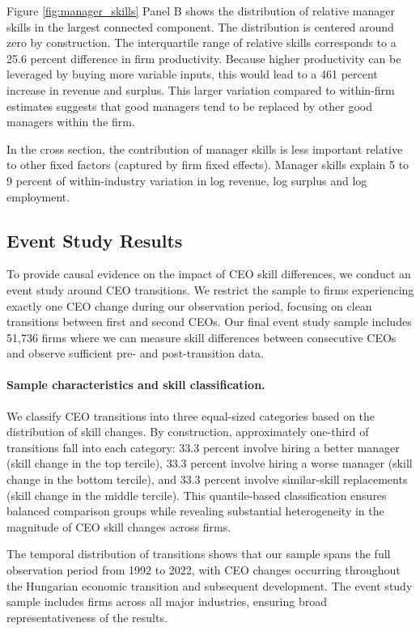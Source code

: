 \documentclass[11pt,a4paper]{article}
\begin{document}
Figure \ref{fig:manager_skills} Panel B shows the distribution of relative manager skills in the largest connected component. The distribution is centered around zero by construction. The interquartile range of relative skills corresponds to a 25.6 percent difference in firm productivity. Because higher productivity can be leveraged by buying more variable inputs, this would lead to a 461 percent increase in revenue and surplus. This larger variation compared to within-firm estimates suggests that good managers tend to be replaced by other good managers within the firm. 

In the cross section, the contribution of manager skills is less important relative to other fixed factors (captured by firm fixed effects). Manager skills explain 5 to 9 percent of within-industry variation in log revenue, log surplus and log employment.

\subsection{Event Study Results}

To provide causal evidence on the impact of CEO skill differences, we conduct an event study around CEO transitions. We restrict the sample to firms experiencing exactly one CEO change during our observation period, focusing on clean transitions between first and second CEOs. Our final event study sample includes 51,736 firms where we can measure skill differences between consecutive CEOs and observe sufficient pre- and post-transition data.

\paragraph{Sample characteristics and skill classification.} We classify CEO transitions into three equal-sized categories based on the distribution of skill changes. By construction, approximately one-third of transitions fall into each category: 33.3 percent involve hiring a better manager (skill change in the top tercile), 33.3 percent involve hiring a worse manager (skill change in the bottom tercile), and 33.3 percent involve similar-skill replacements (skill change in the middle tercile). This quantile-based classification ensures balanced comparison groups while revealing substantial heterogeneity in the magnitude of CEO skill changes across firms.

The temporal distribution of transitions shows that our sample spans the full observation period from 1992 to 2022, with CEO changes occurring throughout the Hungarian economic transition and subsequent development. The event study sample includes firms across all major industries, ensuring broad representativeness of the results.
\end{document}
